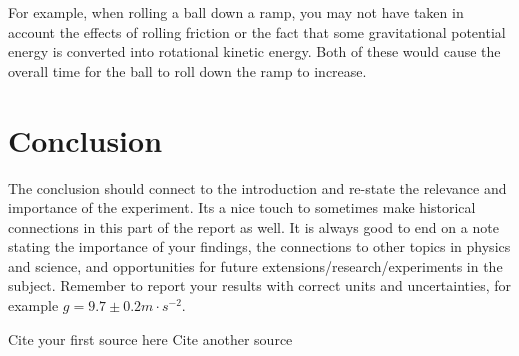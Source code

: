 \documentclass[12pt]{article}
\begin{document}
For example, when rolling a ball down a ramp, you may not have taken in account the effects of rolling friction or the fact that some gravitational potential energy is converted into rotational kinetic energy. Both of these would cause the overall time for the ball to roll down the ramp to increase.


\section{Conclusion}
    The conclusion should connect to the introduction and re-state the relevance and importance of the experiment. Its a nice touch to sometimes make historical connections in this part of the report as well. It is always good to end on a note stating the importance of your findings, the connections to other topics in physics and science, and opportunities for future extensions/research/experiments in the subject. Remember to report your results with correct units and uncertainties, for example $g=9.7 \pm 0.2 m \cdotp s^{-2}$. 
    

\begin{thebibliography}{0}

	
	 Cite your first source here
	 Cite another source
	
\end{thebibliography}
    





\end{document}
